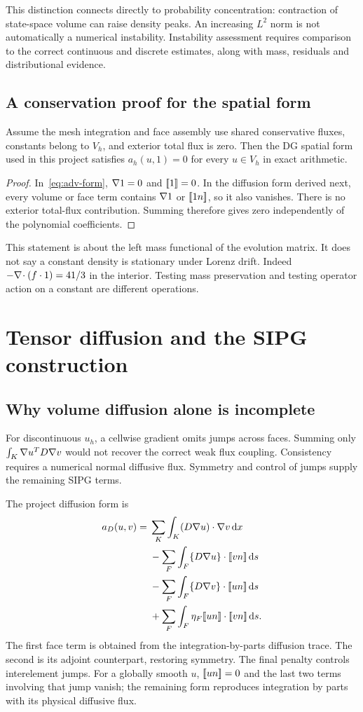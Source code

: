 This distinction connects directly to probability concentration: contraction of state-space volume can raise density peaks. An increasing $L^2$ norm is not automatically a numerical instability. Instability assessment requires comparison to the correct continuous and discrete estimates, along with mass, residuals and distributional evidence.

\section{A conservation proof for the spatial form}
\begin{proposition}\label{prop:spatial-mass}
Assume the mesh integration and face assembly use shared conservative fluxes, constants belong to $V_h$, and exterior total flux is zero. Then the DG spatial form used in this project satisfies $a_h(u,1)=0$ for every $u\in V_h$ in exact arithmetic.
\end{proposition}
\begin{proof}
In~\eqref{eq:adv-form}, $\nabla1=0$ and $[\![1]\!]=0$. In the diffusion form derived next, every volume or face term contains $\nabla1$ or $[\![1n]\!]$, so it also vanishes. There is no exterior total-flux contribution. Summing therefore gives zero independently of the polynomial coefficients.
\end{proof}
This statement is about the left mass functional of the evolution matrix. It does not say a constant density is stationary under Lorenz drift. Indeed $-\nabla\!\cdot(f\cdot1)=41/3$ in the interior. Testing mass preservation and testing operator action on a constant are different operations.

\chapter{Tensor diffusion and the SIPG construction}\label{ch:sipg}
\section{Why volume diffusion alone is incomplete}
For discontinuous $u_h$, a cellwise gradient omits jumps across faces. Summing only $\int_K\nabla u^TD\nabla v$ would not recover the correct weak flux coupling. Consistency requires a numerical normal diffusive flux. Symmetry and control of jumps supply the remaining SIPG terms.

The project diffusion form is
\begin{align}\label{eq:sipg}
a_D(u,v)={}&\sum_K\int_K(D\grad u)\cdot\grad v\dd x\\
&-\sum_F\int_F\avg{D\grad u}\cdot\jump{vn}\dd s\nonumber\\
&-\sum_F\int_F\avg{D\grad v}\cdot\jump{un}\dd s\nonumber\\
&+\sum_F\int_F\eta_F\jump{un}\cdot\jump{vn}\dd s.\nonumber
\end{align}
The first face term is obtained from the integration-by-parts diffusion trace. The second is its adjoint counterpart, restoring symmetry. The final penalty controls interelement jumps. For a globally smooth $u$, $[\![un]\!]=0$ and the last two terms involving that jump vanish; the remaining form reproduces integration by parts with its physical diffusive flux.


